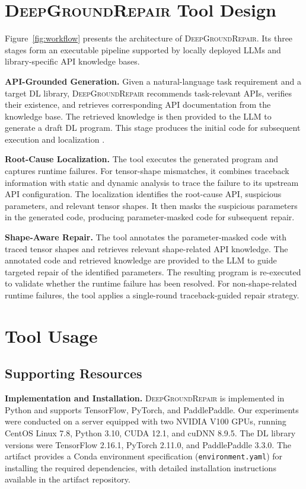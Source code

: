 \documentclass[10pt,conference]{IEEEtran}
\begin{document}


\section{\textsc{DeepGroundRepair} Tool Design}
Figure~\ref{fig:workflow} presents the architecture of \textsc{DeepGroundRepair}. Its three stages form an executable pipeline supported by locally deployed LLMs and library-specific API knowledge bases.

\noindent\textbf{API-Grounded Generation.}
Given a natural-language task requirement and a target DL library, \textsc{DeepGroundRepair} recommends task-relevant APIs, verifies their existence, and retrieves corresponding API documentation from the knowledge base. The retrieved knowledge is then provided to the LLM to generate a draft DL program. This stage produces the initial code for subsequent execution and localization \cite{chen2025apidoc,jain2025apidoc}.
 
\noindent\textbf{Root-Cause Localization.}
The tool executes the generated program and captures runtime failures. For tensor-shape mismatches, it combines traceback information with static and dynamic analysis to trace the failure to its upstream API configuration. The localization identifies the root-cause API, suspicious parameters, and relevant tensor shapes. It then masks the suspicious parameters in the generated code, producing parameter-masked code for subsequent repair.

\noindent\textbf{Shape-Aware Repair.}
The tool annotates the parameter-masked code with traced tensor shapes and retrieves relevant shape-related API knowledge. The annotated code and retrieved knowledge are provided to the LLM to guide targeted repair of the identified parameters. The resulting program is re-executed to validate whether the runtime failure has been resolved. For non-shape-related runtime failures, the tool applies a single-round traceback-guided repair strategy.


\section{Tool Usage}
\subsection{Supporting Resources}
\noindent\textbf{Implementation and Installation.}
\textsc{DeepGroundRepair} is implemented in Python and supports TensorFlow, PyTorch, and PaddlePaddle. Our experiments were conducted on a server equipped with two NVIDIA V100 GPUs, running CentOS Linux 7.8, Python 3.10, CUDA 12.1, and cuDNN 8.9.5. The DL library versions were TensorFlow 2.16.1, PyTorch 2.11.0, and PaddlePaddle 3.3.0. The artifact provides a Conda environment specification (\texttt{environment.yaml}) for installing the required dependencies, with detailed installation instructions available in the artifact repository.
\end{document}
